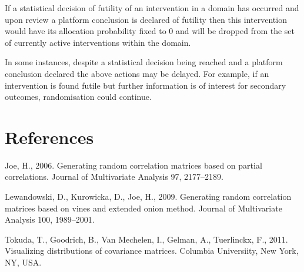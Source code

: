\documentclass[
  11pt,
]{article}
\newlength{\cslhangindent}
\newenvironment{cslreferences}%
  {\setlength{\parindent}{0pt}%
  \everypar{\setlength{\hangindent}{\cslhangindent}}\ignorespaces}%
  {\par}
\begin{document}
If a statistical decision of futility of an intervention in a domain has occurred and upon review a platform conclusion is declared of futility then this intervention would have its allocation probability fixed to 0 and will be dropped from the set of currently active interventions within the domain.

In some instances, despite a statistical decision being reached and a platform conclusion declared the above actions may be delayed.
For example, if an intervention is found futile but further information is of interest for secondary outcomes, randomisation could continue.

\clearpage

\hypertarget{references}{%
\section*{References}\label{references}}

\hypertarget{refs}{}
\begin{cslreferences}
\leavevmode\hypertarget{ref-joe2006generating}{}%
Joe, H., 2006. Generating random correlation matrices based on partial correlations. Journal of Multivariate Analysis 97, 2177--2189.

\leavevmode\hypertarget{ref-lewandowski2009generating}{}%
Lewandowski, D., Kurowicka, D., Joe, H., 2009. Generating random correlation matrices based on vines and extended onion method. Journal of Multivariate Analysis 100, 1989--2001.

\leavevmode\hypertarget{ref-tokuda2011visualizing}{}%
Tokuda, T., Goodrich, B., Van Mechelen, I., Gelman, A., Tuerlinckx, F., 2011. Visualizing distributions of covariance matrices. Columbia Universiity, New York, NY, USA.
\end{cslreferences}
\end{document}
